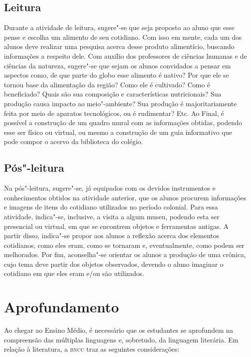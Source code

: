 \documentclass[12pt]{extarticle}
\begin{document}
\subsection{Leitura}

Durante a atividade de leitura, sugere"-se que seja proposto ao aluno que
esse pense e escolha um alimento de seu cotidiano. Com isso em mente,
cada um dos alunos deve realizar uma pesquisa acerca desse produto
alimentício, buscando informações a respeito dele. Com auxílio dos
professores de ciências humanas e de ciências da natureza, sugere"-se que
sejam os alunos convidados a pensar em aspectos como, de que parte do
globo esse alimento é nativo? Por que ele se tornou base da alimentação
da região? Como ele é cultivado? Como é beneficiado? Quais são sua
composição e características nutricionais? Sua produção causa impacto ao
meio"-ambiente? Sua produção é majoritariamente feita por meio de
aparatos tecnológicos, ou é rudimentar? Etc. Ao Final, é possível a
construção de um quadro mural com as informações obtidas, podendo esse
ser físico ou virtual, ou mesmo a construção de um guia informativo que
pode compor o acervo da biblioteca do colégio.

\subsection{Pós"-leitura}

Na pós"-leitura, sugere"-se, já equipados com os devidos
instrumentos e conhecimentos obtidos na atividade anterior, que os
alunos procurem informações e imagens de itens do cotidiano utilizados
no período colonial. Para essa atividade, indica"-se, inclusive, a visita
a algum museu, podendo esta ser presencial ou virtual, em que se
encontrem objetos e ferramentas antigas. A partir disso, indica"-se
propor aos alunos a reflexão acerca dos elementos cotidianos, como eles
eram, como se tornaram e, eventualmente, como podem ser melhorados. Por
fim, aconselha"-se orientar os alunos a produção de uma crônica, cujo
tema deve partir dos objetos observados, devendo o aluno imaginar o
cotidiano em que eles eram e/ou são utilizados.

\section{Aprofundamento}

Ao chegar ao Ensino Médio, é necessário que os estudantes se aprofundem
na compreensão das múltiplas linguagens e, sobretudo, da linguagem
literária. Em relação à literatura, a \textsc{bncc} traz as seguintes
considerações:
\end{document}
